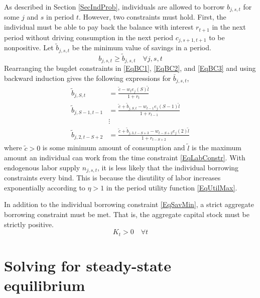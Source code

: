 \documentclass[letterpaper,12pt]{article}
\theoremstyle{definition}
\renewcommand\theenumi{\roman{enumi}}
\begin{document}
  As described in Section \ref{SecIndProb}, individuals are allowed to borrow $b_{j,s,t}$ for some $j$ and $s$ in period $t$. However, two constraints must hold. First, the individual must be able to pay back the balance with interest $r_{t+1}$ in the next period without driving consumption in the next period $c_{j,s+1,t+1}$ to be nonpositive. Let $\tilde{b}_{j,s,t}$ be the minimum value of savings in a period.
  \begin{equation}\label{EqSavMin}
    b_{j,s,t}\geq\tilde{b}_{j,s,t} \quad\forall j,s,t
  \end{equation}
  Rearranging the bugdet constraints in \eqref{EqBC1}, \eqref{EqBC2}, and \eqref{EqBC3} and using backward induction gives the following expressions for $\bar{b}_{j,s,t}$,
  \begin{equation}\label{EqBorConsts}
    \begin{split}
      \tilde{b}_{j,S,t} &= \frac{\tilde{c} - w_te_j(S)\tilde{l}}{1+r_t}  \\
      \tilde{b}_{j,S-1,t-1} &= \frac{\tilde{c} + \tilde{b}_{j,S,t} - w_{t-1}e_j(S-1)\tilde{l}}{1+r_{t-1}} \\
      &\vdots \\
      \tilde{b}_{j,2,t-S+2} &= \frac{\tilde{c} + \tilde{b}_{j,3,t-S+3} - w_{t-S+2}e_j(2)\tilde{l}}{1+r_{t-S+2}}
    \end{split}
  \end{equation}
  where $\tilde{c}>0$ is some minimum amount of consumption and $\tilde{l}$ is the maximum amount an individual can work from the time constraint \eqref{EqLabConstr}. With endogenous labor supply $n_{j,s,t}$, it is less likely that the individual borrowing constraints every bind. This is because the disutility of labor increases exponentially according to $\eta>1$ in the period utility function \eqref{EqUtilMax}.

  In addition to the individual borrowing constraint \eqref{EqSavMin}, a strict aggregate borrowing constraint must be met. That is, the aggregate capital stock must be strictly positive.
  \begin{equation}\label{EqAggrCapConstr}
    K_t > 0 \quad\forall t
  \end{equation}


\newpage
\section{Solving for steady-state equilibrium}\label{AppSSsolve}

  \setcounter{equation}{0}
  \renewcommand\theenumi{\arabic{enumi}}
  \renewcommand\theenumii{\alph{enumii}}
  \renewcommand\theenumiii{\roman{enumiii}}
\end{document}
